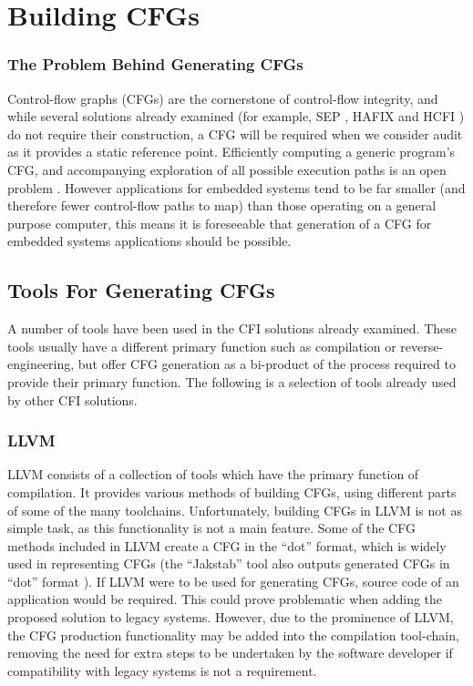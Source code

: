 \section{Building CFGs}

\subsubsection*{The Problem Behind Generating CFGs}

Control-flow graphs (CFGs) are the cornerstone of control-flow integrity, and while several solutions already examined (for example, SEP \cite{Lee2019}, HAFIX \cite{Davi2015} and HCFI \cite{Danger2018}) do not require their construction, a CFG will be required when we consider audit as it provides a static reference point. Efficiently computing a generic program's CFG, and accompanying exploration of all possible execution paths is an open problem \cite{Abera2016}. However applications for embedded systems tend to be far smaller (and therefore fewer control-flow paths to map) than those operating on a general purpose computer, this means it is foreseeable that generation of a CFG for embedded systems applications should be possible.

\subsection{Tools For Generating CFGs}

A number of tools have been used in the CFI solutions already examined. These tools usually have a different primary function such as compilation or reverse-engineering, but offer CFG generation as a bi-product of the process required to provide their primary function. The following is a selection of tools already used by other CFI solutions.

\subsubsection*{LLVM}

LLVM \cite{LLVM:CGO04} consists of a collection of tools which have the primary function of compilation. It provides various methods of building CFGs, using different parts of some of the many toolchains. Unfortunately, building CFGs in LLVM is not as simple task, as this functionality is not a main feature. Some of the CFG methods included in LLVM create a CFG in the ``dot'' format, which is widely used in representing CFGs (the ``Jakstab'' tool also outputs generated CFGs in ``dot'' format \cite{Kinder2008}). If LLVM were to be used for generating CFGs, source code of an application would be required. This could prove problematic when adding the proposed solution to legacy systems. However, due to the prominence of LLVM, the CFG production functionality may be added into the compilation tool-chain, removing the need for extra steps to be undertaken by the software developer if compatibility with legacy systems is not a requirement.

